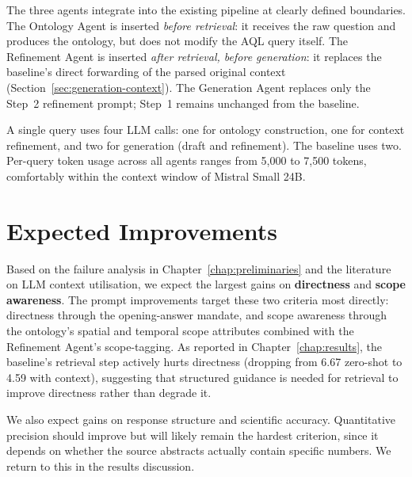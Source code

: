 The three agents integrate into the existing pipeline at clearly defined boundaries. The Ontology Agent is inserted \emph{before retrieval}: it receives the raw question and produces the ontology, but does not modify the AQL query itself. The Refinement Agent is inserted \emph{after retrieval, before generation}: it replaces the baseline's direct forwarding of the parsed original context (Section~\ref{sec:generation-context}). The Generation Agent replaces only the Step~2 refinement prompt; Step~1 remains unchanged from the baseline.

A single query uses four LLM calls: one for ontology construction, one for context refinement, and two for generation (draft and refinement). The baseline uses two. Per-query token usage across all agents ranges from 5{,}000 to 7{,}500 tokens, comfortably within the context window of Mistral Small 24B.

\section{Expected Improvements}
\label{sec:hypothesis}

Based on the failure analysis in Chapter~\ref{chap:preliminaries} and the literature on LLM context utilisation, we expect the largest gains on \textbf{directness} and \textbf{scope awareness}. The prompt improvements target these two criteria most directly: directness through the opening-answer mandate, and scope awareness through the ontology's spatial and temporal scope attributes combined with the Refinement Agent's scope-tagging. As reported in Chapter~\ref{chap:results}, the baseline's retrieval step actively hurts directness (dropping from 6.67 zero-shot to 4.59 with context), suggesting that structured guidance is needed for retrieval to improve directness rather than degrade it.

We also expect gains on response structure and scientific accuracy. Quantitative precision should improve but will likely remain the hardest criterion, since it depends on whether the source abstracts actually contain specific numbers. We return to this in the results discussion.
